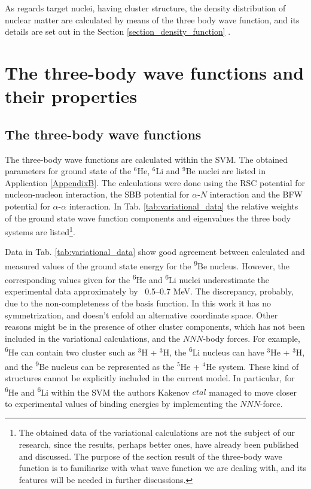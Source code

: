 \documentclass[
12pt, %
oneside, %
english, %
onehalfspacing, %
onehalfspacing, %
headsepline, %
]{MastersDoctoralThesis} %
\newcommand{\he}{\textsuperscript{6}He\xspace}
\newcommand{\li}{\textsuperscript{6}Li\xspace}
\newcommand{\be}{\textsuperscript{9}Be\xspace}
\begin{document}
  
As regards target nuclei, having cluster structure, the density distribution of nuclear matter are calculated by means of the three body wave function, and its details are set out in the Section \ref{section_density_function} .

\chapter{The three-body wave functions and their properties}

\section{The three-body wave functions}
\label{section:3bwf}
The three-body wave functions are calculated within the SVM. The obtained parameters for ground state of the $^6$He, $^6$Li and $^9$Be nuclei are listed in Application \ref{AppendixB}. 
The calculations were done using the RSC potential \cite{day1981three} for nucleon-nucleon interaction, 
the SBB potential \cite{sack1954elastic} for  $\alpha$-$N$ interaction and the BFW potential \cite{buck1977local} for $\alpha$-$\alpha$ interaction.  
In Tab. \ref{tab:variational_data} the relative weights of the ground state wave function components and eigenvalues the three body systems are listed\footnote{The obtained data of the variational calculations are not the subject of our research, since the results, perhaps better ones, have already been published and discussed. The purpose of  the section result of the three-body wave function   is to familiarize with what wave function we are dealing with, and its features will be needed in further discussions.}.

Data in Tab. \ref{tab:variational_data} show good agreement between calculated and measured values of the ground state energy for the \be nucleus.
However, the corresponding values given for the \he and \li nuclei underestimate the experimental data approximately by ~0.5--0.7 MeV. 
The discrepancy, probably, due to the non-completeness of the basis function. 
In this work it has no symmetrization, and doesn't enfold an alternative coordinate space.
Other reasons might be in the presence of other cluster components, which has not been included in the variational calculations, and the $NNN$-body forces.
For example, \he can contain two cluster such as $^3$H + $^3$H, 
the \li nucleus can have $^3$He + $^3$H, and the \be nucleus can be represented as the $^5$He + $^4$He system.
These kind of structures cannot be explicitly included in the current model.
In particular, for \he and \li within the SVM the authors Kakenov $etal$ \cite{kakenov2020properties} managed to move closer to experimental values of binding energies by implementing the $NNN$-force.
 
\end{document}
